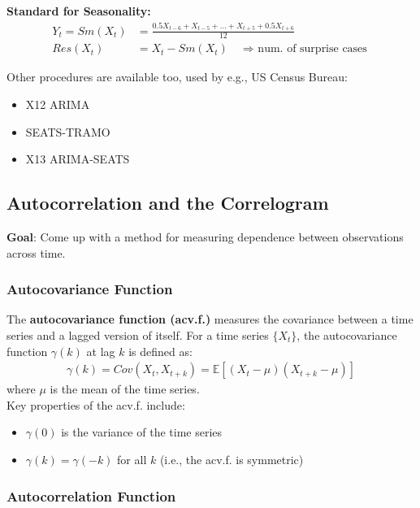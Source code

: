 \textbf{Standard for Seasonality:}
\begin{align*}
    Y_t=Sm(X_t)&=\frac{0.5 X_{t-6} + X_{t-5}+...+X_{t+5} + 0.5 X_{t+6}}{12}\\
    Res(X_t)&=X_t-Sm(X_t) \quad \text{$\Rightarrow$ num. of surprise cases}
\end{align*}

Other procedures are available too, used by e.g., US Census Bureau:
\begin{itemize}
    \item X12 ARIMA
    \item SEATS-TRAMO
    \item X13 ARIMA-SEATS
\end{itemize}

\subsection{Autocorrelation and the Correlogram}

\textbf{Goal}: Come up with a method for measuring dependence between observations across time.\\

\subsubsection{Autocovariance Function}

The \textbf{autocovariance function (acv.f.)} measures the covariance between a time series and a lagged version of itself. For a time series $\{X_t\}$, the autocovariance function $\gamma(k)$ at lag $k$ is defined as:
\begin{align}
    \gamma(k)=Cov(X_t,X_{t+k})=\mathbb{E}\left[(X_t-\mu)(X_{t+k} -\mu) \right]
\end{align}
where $\mu$ is the mean of the time series.\\

Key properties of the acv.f. include:
\begin{itemize}
    \item $\gamma(0)$ is the variance of the time series
    \item $\gamma(k)=\gamma(-k)$ for all $k$ (i.e., the acv.f. is symmetric)
\end{itemize}

\subsubsection{Autocorrelation Function}

